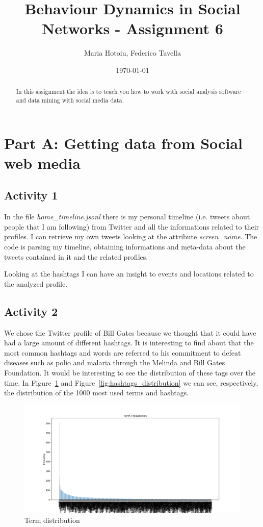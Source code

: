 \documentclass[a4paper]{article}
\title{Behaviour Dynamics in Social Networks - Assignment 6}
\author{Maria Hotoiu, Federico Tavella}
\date{\today}
\begin{document}
\maketitle

\begin{abstract}
In this assignment the idea is to teach you how to work with social analysis software and data mining with social media data.
\end{abstract}

\section{Part A: Getting data from Social web media}

\subsection{Activity 1}

In the file \emph{home\_timeline.jsonl} there is my personal timeline (i.e. tweets about people that I am following) from Twitter and all the informations related to their profiles. I can retrieve my own tweets looking at the attribute \emph{screen\_name}. The code is parsing my timeline, obtaining informations and meta-data about the tweets contained in it and the related profiles.

Looking at the hashtags I can have an insight to events and locations related to the analyzed profile.

\subsection{Activity 2}

We chose the Twitter profile of Bill Gates because we thought that it could have had a large amount of different hashtags. It is interesting to find about that the  most common hashtags and words are referred to his commitment to defeat diseases such as polio and malaria through the Melinda and Bill Gates Foundation. It would be interesting to see the distribution of these tags over the time. In Figure~\ref{fig:term_distribution} and Figure~\ref{fig:hashtags_distribution} we can see, respectively, the distribution of the 1000 most used terms and hashtags.

\begin{figure}[!hbtp]
\centering
\includegraphics[width=\textwidth]{res/img/term_distribution}
\caption{Term distribution}
\label{fig:term_distribution}
\end{figure}
\end{document}
